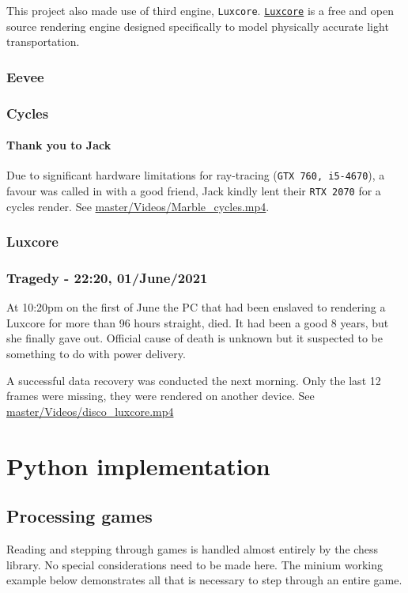 \documentclass[11pt]{article}
\begin{document}
This project also made use of third engine, \texttt{Luxcore}. \href{https://luxcorerender.org/}{\texttt{Luxcore}} is a free and
open source rendering engine designed specifically to model physically accurate
light transportation.
\subsubsection{Eevee}
\label{sec:org7ca2b45}
\subsubsection{Cycles}
\label{sec:orgcf16a82}
\paragraph{Thank you to Jack}
\label{sec:orgaa222c4}
Due to significant hardware limitations for ray-tracing (\texttt{GTX 760, i5-4670}), a
favour was called in with a good friend, Jack kindly lent their \texttt{RTX 2070}  for a
cycles render. See \href{https://github.com/Jake-Moss/blender-chess/blob/master/Videos/Marble\_cycles.mp4}{master/Videos/Marble\_cycles.mp4}.
\subsubsection{Luxcore}
\label{sec:org0aa2b85}
\subsubsection{Tragedy - 22:20, 01/June/2021}
\label{sec:org680e65a}
At 10:20pm on the first of June the PC that had been enslaved to rendering a
Luxcore for more than 96 hours straight, died. It had been a good 8 years, but
she finally gave out. Official cause of death is unknown but it suspected to be
something to do with power delivery.

A successful data recovery was conducted the next morning. Only the last 12
frames were missing, they were rendered on another device. See
\href{https://github.com/Jake-Moss/blender-chess/blob/master/Videos/disco\_luxcore.mp4}{master/Videos/disco\_luxcore.mp4 }
\section{Python implementation}
\label{sec:org9311fbe}
\subsection{Processing games}
\label{sec:org2e6599b}
Reading and stepping through games is handled almost entirely by the chess
library. No special considerations need to be made here. The minium working
example below demonstrates all that is necessary to step through an entire game.
\end{document}
